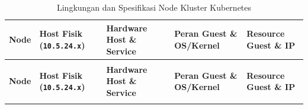 {\footnotesize
\setlength{\tabcolsep}{4.5pt}
\renewcommand{\arraystretch}{1.2}
\begin{spacing}{1.05}
\begin{xltabular}{\textwidth}{>{\raggedright\arraybackslash}p{1.3cm} >{\raggedright\arraybackslash}p{2.2cm} >{\raggedright\arraybackslash}p{3.4cm} >{\raggedright\arraybackslash}X >{\raggedright\arraybackslash}p{3.2cm}}
\caption{Lingkungan dan Spesifikasi Node Kluster Kubernetes} \label{tab:deklarasi_lingkungan} \\
\toprule
\textbf{Node} & \textbf{Host Fisik (\texttt{10.5.24.x})} & \textbf{Hardware Host \& Service} & \textbf{Peran Guest \& OS/Kernel} & \textbf{Resource Guest \& IP} \\
\midrule
\endfirsthead

 \\
\toprule
\textbf{Node} & \textbf{Host Fisik (\texttt{10.5.24.x})} & \textbf{Hardware Host \& Service} & \textbf{Peran Guest \& OS/Kernel} & \textbf{Resource Guest \& IP} \\
\midrule
\endhead

\bottomrule
\endfoot


\end{xltabular}
\end{spacing}}
